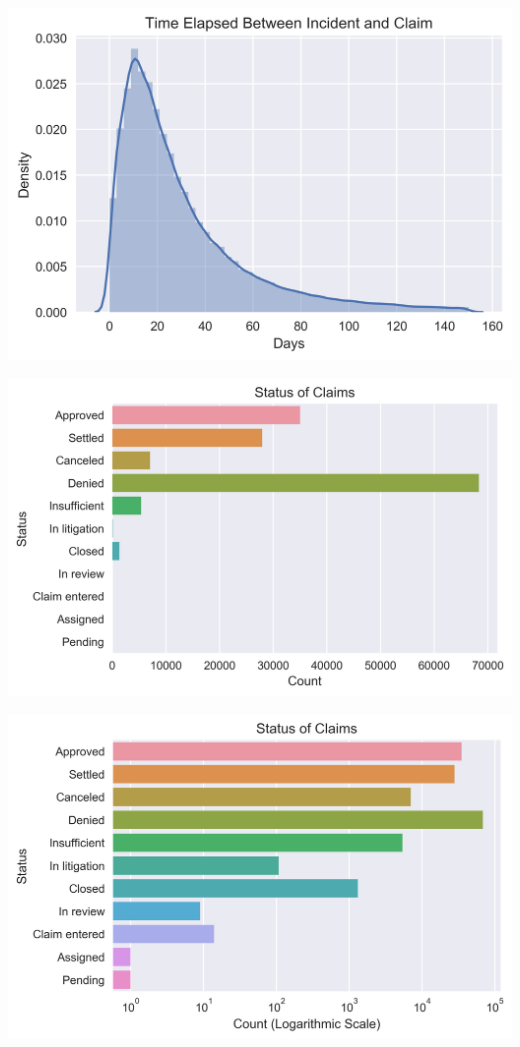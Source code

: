 \documentclass{beamer}
\begin{document}
\begin{frame}
	\includegraphics[keepaspectratio, width = \textwidth, height = \textheight]{../plots/wait_time}
\end{frame}

\begin{frame}
	\includegraphics[keepaspectratio, width = \textwidth, height = \textheight]{../plots/status}
\end{frame}

\begin{frame}
	\includegraphics[keepaspectratio, width = \textwidth, height = \textheight]{../plots/log_status}
\end{frame}
\end{document}
